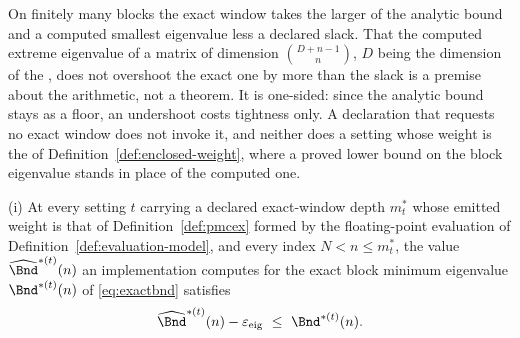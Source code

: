 
On finitely many blocks the exact window takes the larger of the analytic
bound and a computed smallest eigenvalue less a declared slack. That the computed extreme
eigenvalue of a matrix of dimension $\binom{D+n-1}{n}$, $D$ being the
dimension of the , does not overshoot the exact one
by more than the slack is a premise about the arithmetic, not a theorem. It is one-sided: since the analytic bound stays as a floor, an undershoot
costs tightness only. A declaration
that requests no exact window does not invoke it, and neither does a setting
whose weight is the  of Definition~\ref{def:enclosed-weight},
where a proved lower bound on the block eigenvalue stands in place of the
computed one.

\begin{assumption}
\label{ass:eig}
(i) At every setting $t$ carrying a declared exact-window depth $m^{\ast}_t$
whose emitted weight is that of Definition~\ref{def:pmcex} formed by the
floating-point evaluation of Definition~\ref{def:evaluation-model}, and every
index $N<n\le m^{\ast}_t$, the value
$\widehat\Bnd^{\ast(t)}(n)$ an implementation computes for the exact block
minimum eigenvalue $\Bnd^{\ast(t)}(n)$ of \eqref{eq:exactbnd} satisfies
\begin{equation}\label{eq:eigassumption}
  \widehat\Bnd^{\ast(t)}(n)-\varepsilon_{\mathrm{eig}}
  \ \le\ \Bnd^{\ast(t)}(n) .
\end{equation}
\end{assumption}

